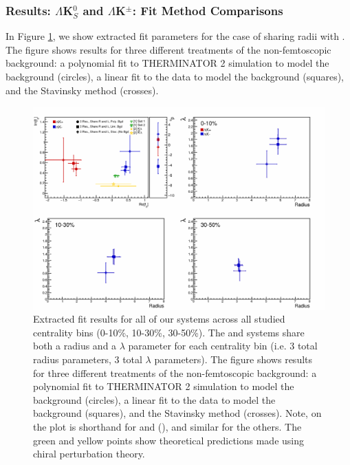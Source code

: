 \documentclass[../AnalysisNoteJBuxton.tex]{subfiles}
\begin{document}
\subsubsection{Results: \texorpdfstring{$\Lambda$K$^{0}_{S}$ and $\Lambda$K$^{\pm}$: Fit Method Comparisons}{TEXT}}
\label{ResultsLamK_FitMethComp}

In Figure \ref{fig:FitResults_ShareR_Sharelam_PolyBgd}, we show extracted fit parameters for the case of \LamKchPALamKchM sharing radii with \LamKchMALamKchP.  The figure shows results for three different treatments of the non-femtoscopic background: a polynomial fit to THERMINATOR 2 simulation to model the background (circles), a linear fit to the data to model the background (squares), and the Stavinsky method (crosses).


\begin{figure}[h]
  \centering
  \includegraphics[width=\textwidth]{7_ResultsAndDiscussion/Figures/CompareAllScattParams_ShareR_Sharelam.pdf}
  \caption[Fit Results: Shared Radii and THERMINATOR 2 Background]{Extracted fit results for all of our \LamALamKpm systems across all studied centrality bins (0-10\%, 10-30\%, 30-50\%).  The \LamKchPALamKchM and \LamKchMALamKchP systems share both a radius and a $\lambda$ parameter for each centrality bin (i.e. 3 total radius parameters, 3 total $\lambda$ parameters).  The figure shows results for three different treatments of the non-femtoscopic background: a polynomial fit to THERMINATOR 2 simulation to model the background (circles), a linear fit to the data to model the background (squares), and the Stavinsky method (crosses).  Note, \LamKchP on the plot is shorthand for \LamKchP and \ALamKchM (\LamKchPALamKchM), and similar for the others.  The green \cite{Liu:2006xja} and yellow \cite{Mai:2009ce} points show theoretical predictions made using chiral perturbation theory.}
  \label{fig:FitResults_ShareR_Sharelam_PolyBgd}
\end{figure}
\end{document}
